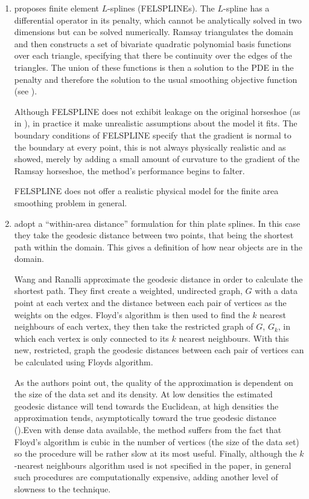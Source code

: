 \begin{enumerate}
\item \cite{ramsay} proposes finite element $L$-splines (FELSPLINEs). The $L$-spline has a differential operator in its penalty, which cannot be analytically solved in two dimensions but can be solved numerically. Ramsay triangulates the domain and then constructs a set of bivariate quadratic polynomial basis functions over each triangle, specifying that there be continuity over the edges of the triangles. The union of these functions is then a solution to the PDE in the penalty and therefore the solution to the usual smoothing objective function (see ).

Although FELSPLINE does not exhibit leakage on the original horseshoe (as in ), in practice it make unrealistic assumptions about the model it fits. The boundary conditions of FELSPLINE specify that the gradient is normal to the boundary at every point, this is not always physically realistic and as \cite{soap} showed, merely by adding a small amount of curvature to the gradient of the Ramsay horseshoe, the method's performance begins to falter.

FELSPLINE does not offer a realistic physical model for the finite area smoothing problem in general.

\item \cite{wangranalli} adopt a ``within-area distance'' formulation for thin plate splines. In this case they take the geodesic distance between two points, that being the shortest path within the domain. This gives a definition of how near objects are in the domain.

Wang and Ranalli approximate the geodesic distance in order to calculate the shortest path. They first create a weighted, undirected graph, $G$ with a data point at each vertex and the distance between each pair of vertices as the weights on the edges. Floyd's algorithm is then used to find the $k$ nearest neighbours of each vertex, they then take the restricted graph of $G$, $G_k$, in which each vertex is only connected to its $k$ nearest neighbours. With this new, restricted, graph the geodesic distances between each pair of vertices can be calculated using Floyds algorithm.

As the authors point out, the quality of the approximation is dependent on the size of the data set and its density. At low densities the estimated geodesic distance will tend towards the Euclidean, at high densities the approximation tends, asymptotically toward the true geodesic distance (\cite{bernstein}).Even with dense data available, the method suffers from the fact that Floyd's algorithm is cubic in the number of vertices (the size of the data set) so the procedure will be rather slow at its most useful. Finally, although the $k$-nearest neighbours algorithm used is not specified in the paper, in general such procedures are computationally expensive, adding another level of slowness to the technique.


\end{enumerate}
